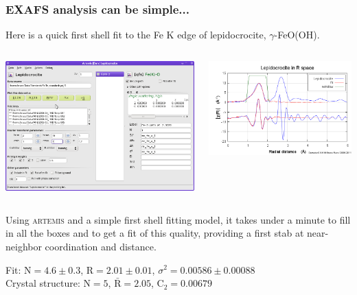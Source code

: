 \documentclass[10pt, xcolor=x11names, compress]{beamer}
\begin{document}
\begin{frame}
  \frametitle{EXAFS analysis can be simple...}

  \begin{center}
    Here is a quick first shell fit to the Fe K edge of lepidocrocite,
    $\gamma$-FeO(OH).
  \end{center}
  \begin{columns}
    \begin{column}{0.45\linewidth}
      \includegraphics[width=\linewidth]{images/qfs.png}
    \end{column}
    \begin{column}{0.5\linewidth}
      \includegraphics[width=\linewidth]{images/qfs_fit.png}      
    \end{column}
  \end{columns}
  \begin{center}
    Using \textsc{artemis} and a simple first shell fitting model, it
    takes under a minute to fill in all the boxes and to get a fit of
    this quality, providing a first stab at near-neighbor coordination
    and distance.
  \end{center}
  \begin{block}{}
    \begin{center}
      Fit: $\mathrm{N=4}.6\pm0.3$, $\mathrm{R}=2.01\pm0.01$, $\sigma^2=0.00586\pm0.00088$\\
      Crystal structure: $\mathrm{N=5}$, $\bar{\mathrm{R}}=2.05$, $\mathrm{C}_2=0.00679$
    \end{center}
  \end{block}


\end{frame}
\end{document}
